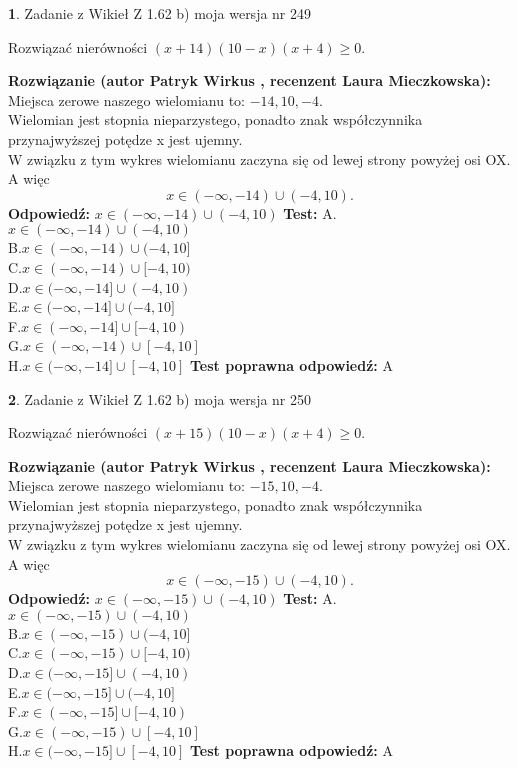 \documentclass[12pt, a4paper]{article}
\theoremstyle{definition} %
\newtheorem{zad}{}
\newcommand{\zadStart}[1]{\begin{zad}#1\newline}
\newcommand{\zadStop}{\end{zad}}
\newcommand{\rozwStart}[2]{\noindent \textbf{Rozwiązanie (autor #1 , recenzent #2): }\newline}
\newcommand{\rozwStop}{\newline}
\newcommand{\odpStart}{\noindent \textbf{Odpowiedź:}\newline}
\newcommand{\odpStop}{\newline}
\newcommand{\testStart}{\noindent \textbf{Test:}\newline}
\newcommand{\testStop}{\newline}
\newcommand{\kluczStart}{\noindent \textbf{Test poprawna odpowiedź:}\newline}
\newcommand{\kluczStop}{\newline}
\begin{document}
\zadStart{Zadanie z Wikieł Z 1.62 b) moja wersja nr 249}

Rozwiązać nierówności $(x+14)(10-x)(x+4)\ge0$.
\zadStop
\rozwStart{Patryk Wirkus}{Laura Mieczkowska}
Miejsca zerowe naszego wielomianu to: $-14, 10, -4$.\\
Wielomian jest stopnia nieparzystego, ponadto znak współczynnika przy\linebreak najwyższej potędze x jest ujemny.\\ W związku z tym wykres wielomianu zaczyna się od lewej strony powyżej osi OX. A więc $$x \in (-\infty,-14) \cup (-4,10).$$
\rozwStop
\odpStart
$x \in (-\infty,-14) \cup (-4,10)$
\odpStop
\testStart
A.$x \in (-\infty,-14) \cup (-4,10)$\\
B.$x \in (-\infty,-14) \cup (-4,10]$\\
C.$x \in (-\infty,-14) \cup [-4,10)$\\
D.$x \in (-\infty,-14] \cup (-4,10)$\\
E.$x \in (-\infty,-14] \cup (-4,10]$\\
F.$x \in (-\infty,-14] \cup [-4,10)$\\
G.$x \in (-\infty,-14) \cup [-4,10]$\\
H.$x \in (-\infty,-14] \cup [-4,10]$
\testStop
\kluczStart
A
\kluczStop



\zadStart{Zadanie z Wikieł Z 1.62 b) moja wersja nr 250}

Rozwiązać nierówności $(x+15)(10-x)(x+4)\ge0$.
\zadStop
\rozwStart{Patryk Wirkus}{Laura Mieczkowska}
Miejsca zerowe naszego wielomianu to: $-15, 10, -4$.\\
Wielomian jest stopnia nieparzystego, ponadto znak współczynnika przy\linebreak najwyższej potędze x jest ujemny.\\ W związku z tym wykres wielomianu zaczyna się od lewej strony powyżej osi OX. A więc $$x \in (-\infty,-15) \cup (-4,10).$$
\rozwStop
\odpStart
$x \in (-\infty,-15) \cup (-4,10)$
\odpStop
\testStart
A.$x \in (-\infty,-15) \cup (-4,10)$\\
B.$x \in (-\infty,-15) \cup (-4,10]$\\
C.$x \in (-\infty,-15) \cup [-4,10)$\\
D.$x \in (-\infty,-15] \cup (-4,10)$\\
E.$x \in (-\infty,-15] \cup (-4,10]$\\
F.$x \in (-\infty,-15] \cup [-4,10)$\\
G.$x \in (-\infty,-15) \cup [-4,10]$\\
H.$x \in (-\infty,-15] \cup [-4,10]$
\testStop
\kluczStart
A
\kluczStop
\end{document}
